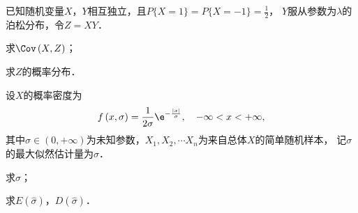 \documentclass[plain,noanswer,medmath]{../../template/jnuexam}
\begin{document}
\begin{problem}[points=11]
已知随机变量$X$，$Y$相互独立，且$P\{X = 1\} = P\{X = - 1\} = \frac{1}{2}$，
$Y$服从参数为$\lambda$的泊松分布，令$Z = XY$．\par
\begin{enumerate*}
\item 求$\Cov \left(X,Z \right)$；
\item 求$Z$的概率分布．
\end{enumerate*}
\end{problem}


\begin{problem}[points=11]
设$X$的概率密度为
$$f\left(x,\sigma \right) = \frac{1}{2\sigma}\e^{- \frac{|x|}{\sigma}},\quad -\infty < x < +\infty ,$$
其中$\sigma \in (0,+\infty)$为未知参数，$X_1,X_2, \cdots X_n$为来自总体$X$的简单随机样本，
记$\sigma$的最大似然估计量为$\hat{\sigma}$．\par
\begin{enumerate*}
\item 求$\hat{\sigma}$；
\item 求$E\left(\hat{\sigma} \right)$，$D\left(\hat{\sigma} \right)$．
\end{enumerate*}
\end{problem}
\end{document}
